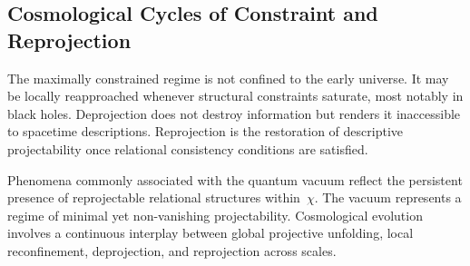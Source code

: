 \subsection{Cosmological Cycles of Constraint and Reprojection}
\label{subsec:cosmic-reprojection-cycle}

The maximally constrained regime is not confined to the early universe.
It may be locally reapproached whenever structural constraints saturate,
most notably in black holes.
Deprojection does not destroy information but renders it inaccessible to
spacetime descriptions.
Reprojection is the restoration of descriptive projectability once
relational consistency conditions are satisfied.

Phenomena commonly associated with the quantum vacuum reflect the
persistent presence of reprojectable relational structures within~$\chi$.
The vacuum represents a regime of minimal yet non-vanishing
projectability.
Cosmological evolution involves a continuous interplay between global
projective unfolding, local reconfinement, deprojection, and reprojection
across scales.

